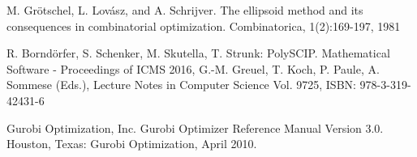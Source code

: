 \documentclass[twoside,a4paper,openright,12pt]{book}
\begin{document}
\begin{thebibliography}{9}
M. Grötschel, L. Lovász, and A. Schrijver. The ellipsoid method and its
consequences in combinatorial optimization. Combinatorica, 1(2):169-197, 1981

R. Borndörfer, S. Schenker, M. Skutella, T. Strunk: PolySCIP.
Mathematical Software - Proceedings of ICMS 2016, G.-M. Greuel, T. Koch, P. Paule, A. Sommese (Eds.),
Lecture Notes in Computer Science Vol. 9725, ISBN: 978-3-319-42431-6

Gurobi Optimization, Inc. Gurobi Optimizer Reference Manual Version 3.0. Houston, Texas: Gurobi Optimization, April 2010.
\end{thebibliography}
\end{document}

